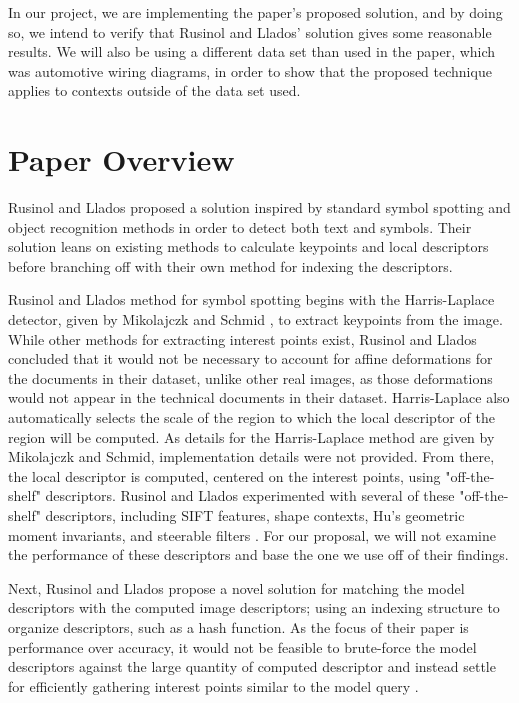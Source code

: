 \documentclass[conference]{IEEEtran}
\begin{document}
In our project, we are implementing the paper's proposed solution, and by doing so, we intend to verify that Rusinol and Llados' solution gives some reasonable results. We will also be using a different data set than used in the paper, which was automotive wiring diagrams, in order to show that the proposed technique applies to contexts outside of the data set used.
 

\section{Paper Overview}
Rusinol and Llados proposed a solution inspired by standard symbol spotting and object recognition methods in order to detect both text and symbols. Their solution leans on existing methods to calculate keypoints and local descriptors before branching off with their own method for indexing the descriptors.

Rusinol and Llados method for symbol spotting begins with the Harris-Laplace detector, given by Mikolajczk and Schmid \cite{b2}, to extract keypoints from the image. While other methods for extracting interest points exist, Rusinol and Llados concluded that it would not be necessary to account for affine deformations for the documents in their dataset, unlike other real images, as those deformations would not appear in the technical documents in their dataset. Harris-Laplace also automatically selects the scale of the region to which the local descriptor of the region will be computed. As details for the Harris-Laplace method are given by Mikolajczk and Schmid, implementation details were not provided. From there, the local descriptor is computed, centered on the interest points, using "off-the-shelf" descriptors. Rusinol and Llados experimented with several of these "off-the-shelf" descriptors, including SIFT features, shape contexts, Hu's geometric moment invariants, and steerable filters \cite{b1}. For our proposal, we will not examine the performance of these descriptors and base the one we use off of their findings.

Next, Rusinol and Llados propose a novel solution for matching the model descriptors with the computed image descriptors; using an indexing structure to organize descriptors, such as a hash function. As the focus of their paper is performance over accuracy, it would not be feasible to brute-force the model descriptors against the large quantity of computed descriptor and instead settle for efficiently gathering interest points similar to the model query \cite{b1}.
\end{document}
